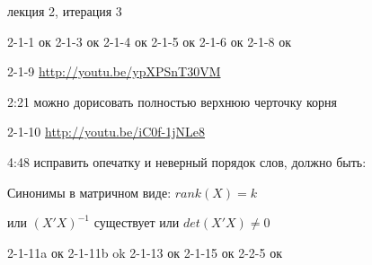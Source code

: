 \documentclass[12pt,a4paper]{article}
\begin{document}
лекция 2, итерация 3

2-1-1 ок
2-1-3 ок
2-1-4 ок
2-1-5 ок
2-1-6 ок
2-1-8 ок
\vspace{1cm}


2-1-9  \url{http://youtu.be/ypXPSnT30VM}

2:21 можно дорисовать полностью верхнюю черточку корня

\vspace{1cm}

2-1-10 \url{http://youtu.be/iC0f-1jNLe8}

4:48 исправить опечатку и неверный порядок слов, должно быть:

Синонимы в матричном виде: $rank(X)=k$

или $(X'X)^{-1}$ существует или $det(X'X)\neq 0$

\vspace{1cm}
2-1-11a ок
2-1-11b ok
2-1-13 ок
2-1-15 ок
2-2-5 ок
\end{document}
